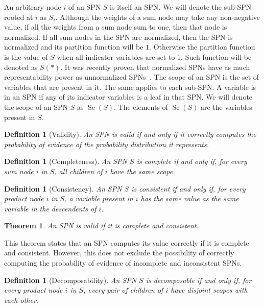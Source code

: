 \documentclass{amsart}
\DeclareMathOperator*{\Sc}{\text{Sc}}
\theoremstyle{plain}
\newcounter{dummy-def}\numberwithin{dummy-def}{section}
\newtheorem{definition}[dummy-def]{Definition}
\newcounter{dummy-thm}\numberwithin{dummy-thm}{section}
\newtheorem{theorem}[dummy-thm]{Theorem}
\newcounter{dummy-prop}\numberwithin{dummy-prop}{section}
\newcounter{dummy-ex}\numberwithin{dummy-ex}{section}
\newcounter{dummy-eg}\numberwithin{dummy-eg}{section}
\numberwithin{equation}{section}
\begin{document}
An arbitrary node $i$ of an SPN $S$ is itself an SPN\@. We will denote the sub-SPN rooted at $i$ as
$S_i$. Although the weights of a sum node may take any non-negative value, if all the weights from
a sum node sum to one, then that node is normalized. If all sum nodes in the SPN are normalized,
then the SPN is normalized and its partition function will be $1$. Otherwise the partition function
is the value of $S$ when all indicator variables are set to $1$. Such function will be denoted as
$S(*)$. It was recently proven that normalized SPNs have as much representability power as
unnormalized SPNs~\cite{theoretical-spn}. The scope of an SPN is the set of variables that are
present in it. The same applies to each sub-SPN\@. A variable is in an SPN if any of its indicator
variables is a leaf in that SPN\@. We will denote the scope of an SPN $S$ as $\Sc(S)$. The elements
of $\Sc(S)$ are the variables present in $S$.

\begin{definition}[Validity]
  An SPN is valid if and only if it correctly computes the probability of evidence of the
  probability distribution it represents.
\end{definition}

\begin{definition}[Completeness]
  An SPN $S$ is complete if and only if, for every sum node $i$ in $S$, all children of $i$ have
  the same scope.
\end{definition}

\begin{definition}[Consistency]
  An SPN $S$ is consistent if and only if, for every product node $i$ in $S$, a variable present in
  $i$ has the same value as the same variable in the descendents of $i$.
\end{definition}

\begin{theorem}
  An SPN is valid if it is complete and consistent.
\end{theorem}

This theorem states that an SPN computes its value correctly if it is complete and consistent.
However, this does not exclude the possibility of correctly computing the probability of evidence
of incomplete and inconsistent SPNs.

\begin{definition}[Decomposability]
  An SPN $S$ is decomposable if and only if, for every product node $i$ in $S$, every pair of
  children of $i$ have disjoint scopes with each other.
\end{definition}
\end{document}
